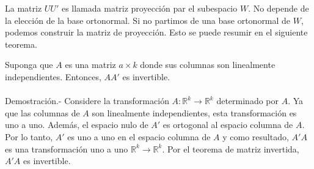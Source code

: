 La matriz $UU'$ es llamada matriz proyección  par el subespacio $W$. No depende de la elección de la base ortonormal. Si no partimos de una base ortonormal de $W$, podemos construir la matriz de proyección. Esto se puede resumir en el siguiente teorema.

\begin{lema}
    Suponga que $A$ es una matriz $a\times k$ donde sus columnas son linealmente independientes. Entonces, $AA'$ es invertible.\\\\
	Demostración.-\; Considere la transformación $A:\mathbb{R}^k\to \mathbb{R}^k$ determinado por $A$. Ya que las columnas de $A$ son linealmente independientes, esta transformación es uno a uno. Además, el espacio nulo de $A'$ es ortogonal al espacio columna de $A$. Por lo tanto, $A'$ es uno a uno en el espacio columna de $A$ y como resultado, $A'A$ es una transformación uno a uno $\mathbb{R}^k\to \mathbb{R}^k$. Por el teorema de matriz invertida, $A'A$ es invertible.
\end{lema}

